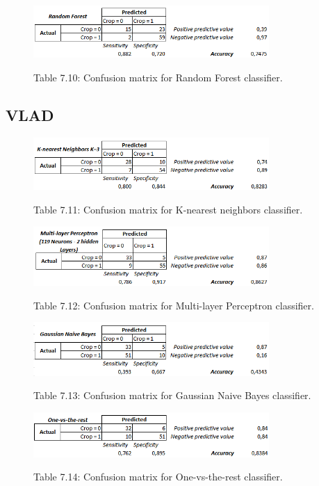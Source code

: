 \documentclass[12pt]{article}
\numberwithin{equation}{section}
\numberwithin{table}{section}
\numberwithin{figure}{section}
\begin{document}
\begin{figure}[H] \centering
	\caption*{Table 7.10: Confusion matrix for Random Forest classifier. }
	\includegraphics[width=0.8\textwidth]{m10.png}
	\label{m10}
\end{figure}


\subsection{VLAD}

\begin{figure}[H] \centering
	\caption*{Table 7.11: Confusion matrix for K-nearest neighbors classifier. }
	\includegraphics[width=0.8\textwidth]{m11.png}
	\label{m11}
\end{figure}

\begin{figure}[H] \centering
	\caption*{Table 7.12: Confusion matrix for Multi-layer Perceptron classifier. }
	\includegraphics[width=0.8\textwidth]{m12.png}
	\label{m12}
\end{figure}

\begin{figure}[H] \centering
	\caption*{Table 7.13: Confusion matrix for Gaussian Naive Bayes classifier. }
	\includegraphics[width=0.8\textwidth]{m13.png}
	\label{m13}
\end{figure}

\begin{figure}[H] \centering
	\caption*{Table 7.14: Confusion matrix for One-vs-the-rest classifier. }
	\includegraphics[width=0.8\textwidth]{m14.png}
	\label{m14}
\end{figure}
\end{document}

